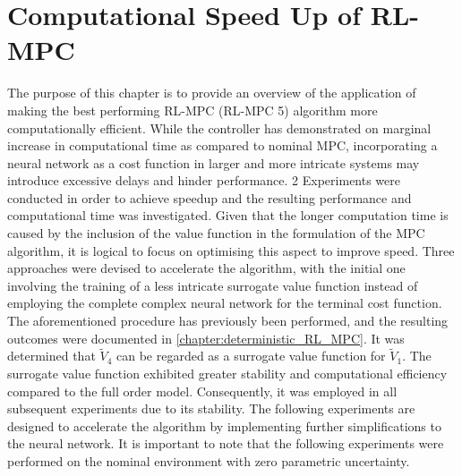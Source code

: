 \chapter{Computational Speed Up of RL-MPC}
\label{chapter:speed-up}

The purpose of this chapter is to provide an overview of the application of making the  best performing RL-MPC (RL-MPC 5) algorithm more computationally efficient. While the controller has demonstrated on marginal increase in computational time as compared to nominal MPC, incorporating a neural network as a cost function in larger and more intricate systems may introduce excessive delays and hinder performance. 2 Experiments were conducted in order to achieve speedup and the resulting performance and computational time was investigated. Given that the longer computation time is caused by the inclusion of the value function in the formulation of the MPC algorithm, it is logical to focus on optimising this aspect to improve speed. Three approaches were devised to accelerate the algorithm, with the initial one involving the training of a less intricate surrogate value function instead of employing the complete complex neural network for the terminal cost function. The aforementioned procedure has previously been performed, and the resulting outcomes were documented in \autoref{chapter:deterministic_RL_MPC}. It was determined that $\tilde{V}_4$ can be regarded as a surrogate value function for $\tilde{V}_1$. The surrogate value function exhibited greater stability and computational efficiency compared to the full order model. Consequently, it was employed in all subsequent experiments due to its stability. The following experiments are designed to accelerate the algorithm by implementing further simplifications to the neural network. It is important to note that the following experiments were performed on the nominal environment with zero parametric uncertainty.

